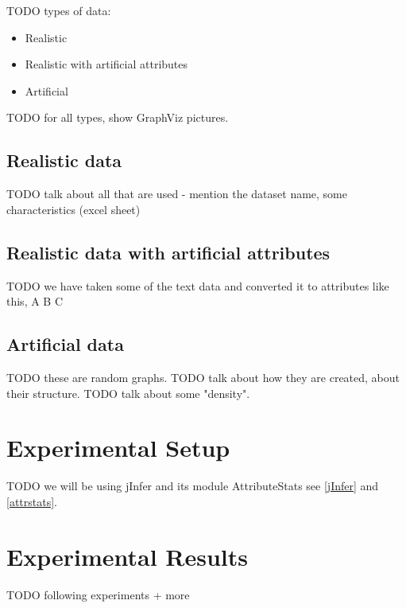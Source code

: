\documentclass[a4paper,12pt,oneside]{report}
\begin{document}
TODO types of data:
\begin{itemize}
	\item Realistic 
  \item Realistic with artificial attributes
	\item Artificial
\end{itemize}

TODO for all types, show GraphViz pictures.

\subsection{Realistic data}

TODO talk about all that are used - mention the dataset name, some characteristics (excel sheet)

\subsection{Realistic data with artificial attributes}

TODO we have taken some of the text data and converted it to attributes like this, A B C

\subsection{Artificial data}

TODO these are random graphs.
TODO talk about how they are created, about their structure.
TODO talk about some "density".

\section{Experimental Setup}

TODO we will be using jInfer and its module AttributeStats see \ref{jInfer} and \ref{attrstats}.

\section{Experimental Results}

TODO following experiments + more
\end{document}

